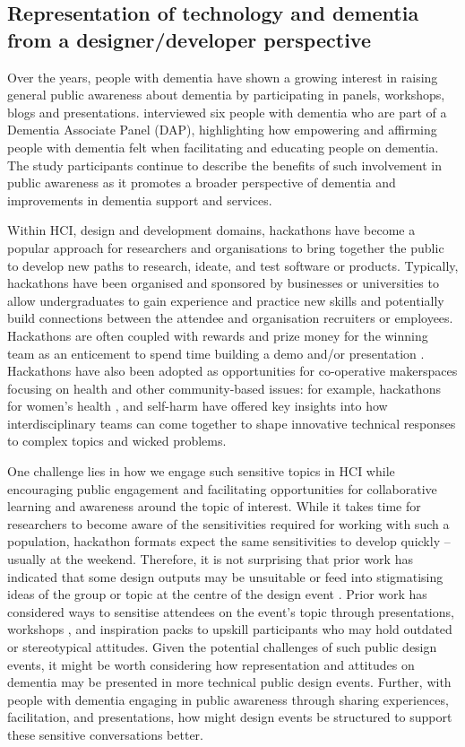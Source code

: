 \subsection{Representation of technology and dementia from a designer/developer perspective}
\label{BL:gap:engagement}
Over the years, people with dementia have shown a growing interest in raising general public awareness about dementia by participating in panels, workshops, blogs and presentations. \cite{innes2021s} interviewed six people with dementia who are part of a Dementia Associate Panel (DAP), highlighting how empowering and affirming people with dementia felt when facilitating and educating people on dementia. The study participants continue to describe the benefits of such involvement in public awareness as it promotes a broader perspective of dementia and improvements in dementia support and services.

Within HCI, design and development domains, hackathons have become a popular approach for researchers and organisations to bring together the public to develop new paths to research, ideate, and test software or products. Typically, hackathons have been organised and sponsored by businesses or universities to allow undergraduates to gain experience and practice new skills and potentially build connections between the attendee and organisation recruiters or employees. Hackathons are often coupled with rewards and prize money for the winning team as an enticement to spend time building a demo and/or presentation \citep{johnson_civic_2014}. Hackathons have also been adopted as opportunities for co-operative makerspaces focusing on health and other community-based issues: for example, hackathons for women’s health \citep{paganini_engaging_2020}, and self-harm \citep{birbeck_self_2017} have offered key insights into how interdisciplinary teams can come together to shape innovative technical responses to complex topics and wicked problems. 

One challenge lies in how we engage such sensitive topics in HCI while encouraging public engagement and facilitating opportunities for collaborative learning and awareness around the topic of interest. While it takes time for researchers to become aware of the sensitivities required for working with such a population, hackathon formats expect the same sensitivities to develop quickly – usually at the weekend. Therefore, it is not surprising that prior work has indicated that some design outputs may be unsuitable or feed into stigmatising ideas of the group or topic at the centre of the design event \citep{toros_co-creation_2020}. Prior work has considered ways to sensitise attendees on the event's topic through presentations, workshops \citep{hope_hackathons_2019}, and inspiration packs \citep{birbeck_self_2017} to upskill participants who may hold outdated or stereotypical attitudes. Given the potential challenges of such public design events, it might be worth considering how representation and attitudes on dementia may be presented in more technical public design events. Further, with people with dementia engaging in public awareness through sharing experiences, facilitation, and presentations, how might design events be structured to support these sensitive conversations better.

